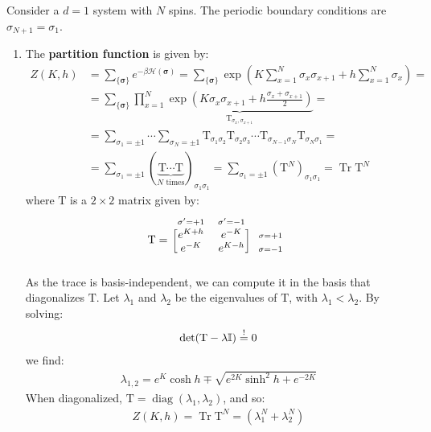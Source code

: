 \documentclass[12pt,a4paper]{report}
\begin{document}
    Consider a $d=1$ system with $N$ spins. The periodic boundary conditions are $\sigma_{N+1} = \sigma_1$.
    \begin{enumerate}
        \item The \textbf{partition function} is given by:
        \begin{align*}
            Z(K,h) &= \sum_{\{\bm{\sigma}\}} e^{-\beta \mathcal{H}(\bm{\sigma})} = \sum_{\{\bm{\sigma}\}} \exp\left(K \sum_{x=1}^N \sigma_x \sigma_{x+1} + h \sum_{x=1}^N \sigma_x\right) =\\
            &= \sum_{\{\bm{\sigma}\}} \prod_{x=1}^N \underbrace{\exp\left(K \sigma_x \sigma_{x+1} + h \frac{\sigma_x + \sigma_{x+1}}{2} \right)}_{\mathrm{T}_{\sigma_x,\sigma_{x+1}}}  =\\
            &= \sum_{\sigma_1 = \pm 1} \cdots \sum_{\sigma_{N} = \pm 1} \mathrm{T}_{\sigma_1 \sigma_2} \mathrm{T}_{\sigma_2 \sigma_3} \cdots \mathrm{T}_{\sigma_{N-1} \sigma_N} \mathrm{T}_{\sigma_N \sigma_1} =\\
            &= \sum_{\sigma_1 = \pm 1} (\underbrace{\mathrm{T} \cdots \mathrm{T}}_{\text{$N$ times}})_{\sigma_1 \sigma_1} = \sum_{\sigma_1 = \pm 1} (\mathrm{T}^N)_{\sigma_1 \sigma_1} = \operatorname{Tr} \mathrm{T}^N 
        \end{align*} 
        where $\mathrm{T}$ is a $2\times 2$ matrix given by:
        \begin{align}\label{eqn:T-matrix1}
            \mathrm{T} = \begin{blockarray}{l*{2}{c}}
                \begin{block}{*{2}{>{\scriptstyle}c<{}}l}
                    \sigma'=+1 & \sigma'=-1 & \\
                \end{block}
                \begin{block}{[*{2}{c}]>{\scriptstyle}r<{}}
                    e^{K+h} & e^{-K} & \sigma=+1 \\
                    e^{-K}   & e^{K-h} & \sigma = -1\\
                \end{block}
            \end{blockarray}
        \end{align}
        As the trace is basis-independent, we can compute it in the basis that diagonalizes $\mathrm{T}$. Let $\lambda_1$ and $\lambda_2$ be the eigenvalues of $\mathrm{T}$, with $\lambda_1 < \lambda_2$. By solving:
        \begin{align*}
            \operatorname{det}(\mathrm{T} - \lambda \mathbb{I}) \overset{!}{=} 0
        \end{align*}
        we find:
        \begin{align}\label{eqn:lambdas}
            \lambda_{1,2} = e^{K} \cosh h \mp \sqrt{e^{2K} \sinh^2 h + e^{-2K}}
        \end{align}
        When diagonalized, $\mathrm{T} = \operatorname{diag}(\lambda_1, \lambda_2)$, and so:
        \begin{align}\label{eqn:partition-pbc}
            Z(K,h) = \operatorname{Tr} \mathrm{T}^N = (\lambda_1^N + \lambda_2^N) 
        \end{align} 


\end{enumerate}
\end{document}

